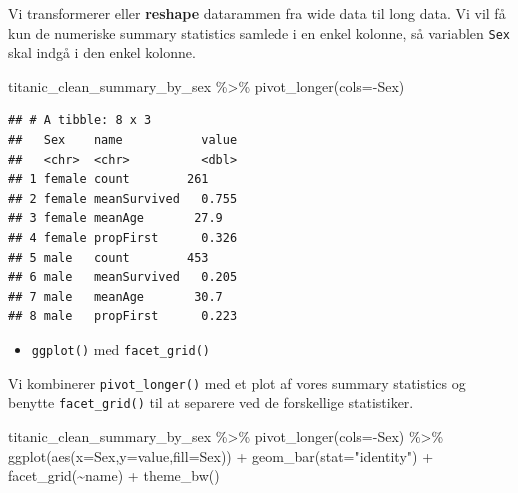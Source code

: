 \documentclass[
]{book}
\newenvironment{Shaded}{\begin{snugshade}}{\end{snugshade}}
\newcommand{\AttributeTok}[1]{\textcolor[rgb]{0.77,0.63,0.00}{#1}}
\newcommand{\FunctionTok}[1]{\textcolor[rgb]{0.00,0.00,0.00}{#1}}
\newcommand{\NormalTok}[1]{#1}
\newcommand{\SpecialCharTok}[1]{\textcolor[rgb]{0.00,0.00,0.00}{#1}}
\newcommand{\StringTok}[1]{\textcolor[rgb]{0.31,0.60,0.02}{#1}}
\providecommand{\tightlist}{%
  \setlength{\itemsep}{0pt}\setlength{\parskip}{0pt}}
\begin{document}
Vi transformerer eller \textbf{reshape} datarammen fra wide data til long data. Vi vil få kun de numeriske summary statistics samlede i en enkel kolonne, så variablen \texttt{Sex} skal indgå i den enkel kolonne.

\begin{Shaded}
\begin{Highlighting}[]
\NormalTok{titanic\_clean\_summary\_by\_sex }\SpecialCharTok{\%\textgreater{}\%} \FunctionTok{pivot\_longer}\NormalTok{(}\AttributeTok{cols=}\SpecialCharTok{{-}}\NormalTok{Sex)}
\end{Highlighting}
\end{Shaded}

\begin{verbatim}
## # A tibble: 8 x 3
##   Sex    name           value
##   <chr>  <chr>          <dbl>
## 1 female count        261    
## 2 female meanSurvived   0.755
## 3 female meanAge       27.9  
## 4 female propFirst      0.326
## 5 male   count        453    
## 6 male   meanSurvived   0.205
## 7 male   meanAge       30.7  
## 8 male   propFirst      0.223
\end{verbatim}

\begin{itemize}
\tightlist
\item
  \texttt{ggplot()} med \texttt{facet\_grid()}
\end{itemize}

Vi kombinerer \texttt{pivot\_longer()} med et plot af vores summary statistics og benytte \texttt{facet\_grid()} til at separere ved de forskellige statistiker.

\begin{Shaded}
\begin{Highlighting}[]
\NormalTok{titanic\_clean\_summary\_by\_sex }\SpecialCharTok{\%\textgreater{}\%} 
  \FunctionTok{pivot\_longer}\NormalTok{(}\AttributeTok{cols=}\SpecialCharTok{{-}}\NormalTok{Sex) }\SpecialCharTok{\%\textgreater{}\%}
  \FunctionTok{ggplot}\NormalTok{(}\FunctionTok{aes}\NormalTok{(}\AttributeTok{x=}\NormalTok{Sex,}\AttributeTok{y=}\NormalTok{value,}\AttributeTok{fill=}\NormalTok{Sex)) }\SpecialCharTok{+} 
  \FunctionTok{geom\_bar}\NormalTok{(}\AttributeTok{stat=}\StringTok{"identity"}\NormalTok{) }\SpecialCharTok{+} 
  \FunctionTok{facet\_grid}\NormalTok{(}\SpecialCharTok{\textasciitilde{}}\NormalTok{name) }\SpecialCharTok{+}
  \FunctionTok{theme\_bw}\NormalTok{()}
\end{Highlighting}
\end{Shaded}
\end{document}
